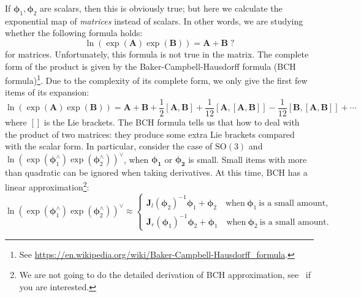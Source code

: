 If $\boldsymbol{\phi}_1, \boldsymbol{\phi}_2$ are scalars, then this is obviously true; but here we calculate the exponential map of \textit{matrices} instead of scalars. In other words, we are studying whether the following formula holds:
\[
\ln \left( \exp \left( \mathbf{A} \right) \exp \left( \mathbf{B} \right) \right) = \mathbf{A} + \mathbf{B} \; ?
\]
for matrices. Unfortunately, this formula is not true in the matrix. The complete form of the product is given by the Baker-Campbell-Hausdorff formula (BCH formula)\footnote{ See \url{https://en.wikipedia.org/wiki/Baker-Campbell-Hausdorff\_formula}. }. Due to the complexity of its complete form, we only give the first few items of its expansion:
\begin{equation}
\ln \left( {\exp \left( \mathbf{A} \right)\exp \left( \mathbf{B} \right)} \right) = \mathbf{A} + \mathbf{B} + \frac{1}{2}\left[ {\mathbf{A}, \mathbf{B}} \right] + \frac{1}{{12}}\left[ {\mathbf{A},\left[ {\mathbf{A}, \mathbf{B}} \right]} \right] - \frac{1}{{12}}\left[ {\mathbf{B},\left[ {\mathbf{A} ,\mathbf{B}} \right]} \right] + \cdots
\end{equation}
where $[]$ is the Lie brackets. The BCH formula tells us that how to deal with the product of two matrices: they produce some extra Lie brackets compared with the scalar form. In particular, consider the case of $\mathrm{SO}(3)$ and $\ln { \left( {\exp \left( { \boldsymbol{\phi} _1^ \wedge } \right)\exp \left ( {\boldsymbol{\phi} _2^ \wedge } \right)} \right) ^ \vee }$, when $\boldsymbol{\phi_1}$ or $\boldsymbol{\phi_2}$ is small. Small items with more than quadratic can be  ignored when taking derivatives. At this time, BCH has a linear approximation\footnote{We are not going to do the detailed derivation of BCH approximation, see~\cite{Barfoot2016} if you are interested. }:
\begin{equation}
\ln { \left( {\exp \left( { \boldsymbol{\phi} _1^ \wedge } \right)\exp \left( {\boldsymbol{\phi} _2^ \wedge } \right)} \right ) ^ \vee } \approx \left\{
\begin{array}{l}
{\mathbf{J}_l}{\left( {{\boldsymbol{\phi} _2}} \right)^{ - 1}}{ \boldsymbol{\phi} _1} + {\boldsymbol{\phi} _2 } \quad \text{when} \ \boldsymbol{\phi}_1 \ \text{is a small amount},\\
{\mathbf{J}_r}{\left( {{\boldsymbol{\phi} _1}} \right)^{ - 1}}{\boldsymbol{\phi} _2} + {\boldsymbol{\phi} _1 } \quad \text{when} \  \boldsymbol{\phi}_2 \ \text{is a small amount}.
\end{array} \right.
\end{equation}

